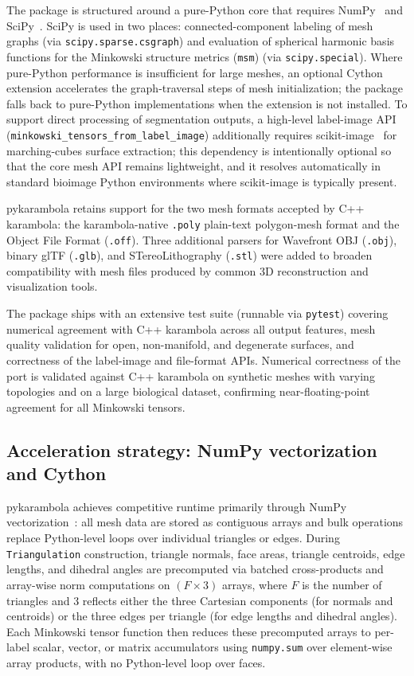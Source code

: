 \documentclass[unnumsec,webpdf,contemporary,large,namedate]{oup-authoring-template}
\begin{document}
The package is structured around a pure-Python core that requires NumPy~\citep{harris2020numpy} and SciPy~\citep{virtanen2020scipy}.
SciPy is used in two places: connected-component labeling of mesh graphs (via \texttt{scipy.sparse.csgraph}) and evaluation of spherical harmonic basis functions for the Minkowski structure metrics (\texttt{msm}) (via \texttt{scipy.special}).
Where pure-Python performance is insufficient for large meshes, an optional Cython extension accelerates the graph-traversal steps of mesh initialization; the package falls back to pure-Python implementations when the extension is not installed.
To support direct processing of segmentation outputs, a high-level label-image API (\texttt{minkowski\_tensors\_from\_label\_image}) additionally requires scikit-image~\citep{vanderwalt2014scikit} for marching-cubes surface extraction; this dependency is intentionally optional so that the core mesh API remains lightweight, and it resolves automatically in standard bioimage Python environments where scikit-image is typically present.

pykarambola retains support for the two mesh formats accepted by C++ karambola: the karambola-native \texttt{.poly} plain-text polygon-mesh format and the Object File Format (\texttt{.off}).
Three additional parsers for Wavefront OBJ (\texttt{.obj}), binary glTF (\texttt{.glb}), and STereoLithography (\texttt{.stl}) were added to broaden compatibility with mesh files produced by common 3D reconstruction and visualization tools.

The package ships with an extensive test suite (runnable via \texttt{pytest}) covering numerical agreement with C++ karambola across all output features, mesh quality validation for open, non-manifold, and degenerate surfaces, and correctness of the label-image and file-format APIs.
Numerical correctness of the port is validated against C++ karambola on synthetic meshes with varying topologies and on a large biological dataset, confirming near-floating-point agreement for all Minkowski tensors.

\subsection{Acceleration strategy: NumPy vectorization and Cython}
pykarambola achieves competitive runtime primarily through NumPy vectorization~\citep{harris2020numpy}: all mesh data are stored as contiguous arrays and bulk operations replace Python-level loops over individual triangles or edges.
During \texttt{Triangulation} construction, triangle normals, face areas, triangle centroids, edge lengths, and dihedral angles are precomputed via batched cross-products and array-wise norm computations on $(F \times 3)$ arrays, where $F$ is the number of triangles and 3 reflects either the three Cartesian components (for normals and centroids) or the three edges per triangle (for edge lengths and dihedral angles).
Each Minkowski tensor function then reduces these precomputed arrays to per-label scalar, vector, or matrix accumulators using \texttt{numpy.sum} over element-wise array products, with no Python-level loop over faces.
\end{document}
